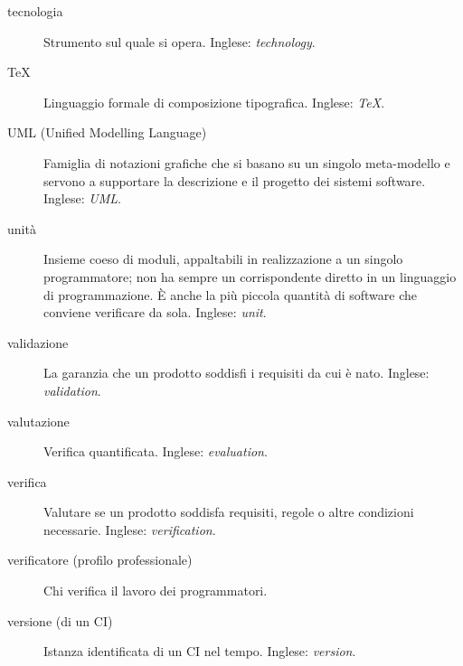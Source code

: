 \documentclass[a4paper]{article}
\begin{document}
\begin{description}
	\item[tecnologia] 

			Strumento sul quale si opera. Inglese: \emph{technology}.
			
	\item[TeX] 

			Linguaggio formale di composizione tipografica. Inglese: \emph{TeX}.
			
	\item[UML (Unified Modelling Language)] 

			Famiglia di notazioni grafiche che si basano su un singolo meta-modello e servono a supportare la descrizione e il progetto dei sistemi software. Inglese: \emph{UML}.
			
	\item[unità] 

			Insieme coeso di moduli, appaltabili in realizzazione a un singolo programmatore; non ha sempre un corrispondente diretto in un linguaggio di programmazione. È anche la più piccola quantità di software che conviene verificare da sola. Inglese: \emph{unit}.
			
	\item[validazione] 

			La garanzia che un prodotto soddisfi i requisiti da cui è nato. Inglese: \emph{validation}.
			
	\item[valutazione] 

			Verifica quantificata. Inglese: \emph{evaluation}.
			
	\item[verifica] 

			Valutare se un prodotto soddisfa requisiti, regole o altre condizioni necessarie. Inglese: \emph{verification}.
			
	\item[verificatore (profilo professionale)] 

			Chi verifica il lavoro dei programmatori.
			
	\item[versione (di un CI)] 

			Istanza identificata di un CI nel tempo. Inglese: \emph{version}.
		
	\end{description}

	


\nocite{*}
\end{document}
